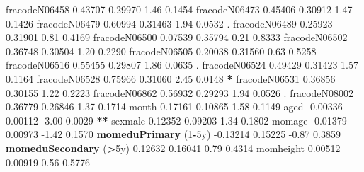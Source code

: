 \documentclass[12pt, krantz2,]{krantz}
\newenvironment{Shaded}{\begin{snugshade}}{\end{snugshade}}
\newcommand{\DecValTok}[1]{\textcolor[rgb]{0.06,0.06,0.06}{#1}}
\newcommand{\FloatTok}[1]{\textcolor[rgb]{0.06,0.06,0.06}{#1}}
\newcommand{\KeywordTok}[1]{\textcolor[rgb]{0.27,0.27,0.27}{\textbf{#1}}}
\newcommand{\NormalTok}[1]{#1}
\newcommand{\OperatorTok}[1]{\textcolor[rgb]{0.43,0.43,0.43}{\textbf{#1}}}
\newcommand{\StringTok}[1]{\textcolor[rgb]{0.5,0.5,0.5}{#1}}
\theoremstyle{definition}
\theoremstyle{definition}
\theoremstyle{definition}
\newcommand{\1}{\mathbbm{1}}
\begin{document}
\begin{Shaded}
\begin{Highlighting}[]
\NormalTok{fracodeN06458                    }\FloatTok{0.43707}    \FloatTok{0.29970}    \FloatTok{1.46}   \FloatTok{0.1454}   
\NormalTok{fracodeN06473                    }\FloatTok{0.45406}    \FloatTok{0.30912}    \FloatTok{1.47}   \FloatTok{0.1426}   
\NormalTok{fracodeN06479                    }\FloatTok{0.60994}    \FloatTok{0.31463}    \FloatTok{1.94}   \FloatTok{0.0532}\NormalTok{ . }
\NormalTok{fracodeN06489                    }\FloatTok{0.25923}    \FloatTok{0.31901}    \FloatTok{0.81}   \FloatTok{0.4169}   
\NormalTok{fracodeN06500                    }\FloatTok{0.07539}    \FloatTok{0.35794}    \FloatTok{0.21}   \FloatTok{0.8333}   
\NormalTok{fracodeN06502                    }\FloatTok{0.36748}    \FloatTok{0.30504}    \FloatTok{1.20}   \FloatTok{0.2290}   
\NormalTok{fracodeN06505                    }\FloatTok{0.20038}    \FloatTok{0.31560}    \FloatTok{0.63}   \FloatTok{0.5258}   
\NormalTok{fracodeN06516                    }\FloatTok{0.55455}    \FloatTok{0.29807}    \FloatTok{1.86}   \FloatTok{0.0635}\NormalTok{ . }
\NormalTok{fracodeN06524                    }\FloatTok{0.49429}    \FloatTok{0.31423}    \FloatTok{1.57}   \FloatTok{0.1164}   
\NormalTok{fracodeN06528                    }\FloatTok{0.75966}    \FloatTok{0.31060}    \FloatTok{2.45}   \FloatTok{0.0148} \OperatorTok{*}\StringTok{ }
\NormalTok{fracodeN06531                    }\FloatTok{0.36856}    \FloatTok{0.30155}    \FloatTok{1.22}   \FloatTok{0.2223}   
\NormalTok{fracodeN06862                    }\FloatTok{0.56932}    \FloatTok{0.29293}    \FloatTok{1.94}   \FloatTok{0.0526}\NormalTok{ . }
\NormalTok{fracodeN08002                    }\FloatTok{0.36779}    \FloatTok{0.26846}    \FloatTok{1.37}   \FloatTok{0.1714}   
\NormalTok{month                            }\FloatTok{0.17161}    \FloatTok{0.10865}    \FloatTok{1.58}   \FloatTok{0.1149}   
\NormalTok{aged                            }\FloatTok{-0.00336}    \FloatTok{0.00112}   \FloatTok{-3.00}   \FloatTok{0.0029} \OperatorTok{**}
\NormalTok{sexmale                          }\FloatTok{0.12352}    \FloatTok{0.09203}    \FloatTok{1.34}   \FloatTok{0.1802}   
\NormalTok{momage                          }\FloatTok{-0.01379}    \FloatTok{0.00973}   \FloatTok{-1.42}   \FloatTok{0.1570}   
\KeywordTok{momeduPrimary}\NormalTok{ (}\DecValTok{1}\OperatorTok{-}\NormalTok{5y)            }\FloatTok{-0.13214}    \FloatTok{0.15225}   \FloatTok{-0.87}   \FloatTok{0.3859}   
\KeywordTok{momeduSecondary}\NormalTok{ (}\OperatorTok{>}\NormalTok{5y)            }\FloatTok{0.12632}    \FloatTok{0.16041}    \FloatTok{0.79}   \FloatTok{0.4314}   
\NormalTok{momheight                        }\FloatTok{0.00512}    \FloatTok{0.00919}    \FloatTok{0.56}   \FloatTok{0.5776}   

\end{Highlighting}
\end{Shaded}
\end{document}

